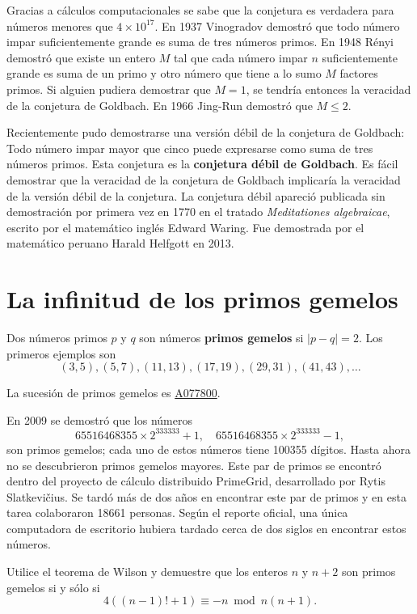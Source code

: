 Gracias a cálculos computacionales se sabe que la conjetura es verdadera para
números menores que $4\times 10^{17}$. En 1937 Vinogradov demostró que todo
número impar suficientemente grande es suma de tres números primos. En 1948
Rényi demostró que existe un entero $M$ tal que cada número impar $n$
suficientemente grande es suma de un primo y otro número que tiene a lo sumo
$M$ factores primos. Si alguien pudiera demostrar que $M=1$, se tendría
entonces la veracidad de la conjetura de Goldbach. En 1966 Jing-Run demostró
que $M\leq 2$. 

Recientemente pudo demostrarse una versión débil de la conjetura de Goldbach:
Todo número impar mayor que cinco puede expresarse como suma de tres números
primos.  Esta conjetura es la \textbf{conjetura débil de Goldbach}. Es fácil
demostrar que la veracidad de la conjetura de Goldbach implicaría la veracidad
de la versión débil de la conjetura.  La conjetura débil apareció publicada sin
demostración por primera vez en 1770 en el tratado \emph{Meditationes
algebraicae}, escrito por el matemático inglés Edward Waring. Fue demostrada
por el matemático peruano Harald Helfgott en 2013. 

\section*{La infinitud de los primos gemelos}

Dos números primos $p$ y $q$ son números \textbf{primos gemelos} si $|p-q|=2$.
Los primeros ejemplos son
\[
	(3, 5), (5, 7), (11, 13), (17, 19), (29, 31), (41, 43),\dots
\]

La sucesión de primos gemelos es 
\href{https://oeis.org/A077800}{A077800}.

En 2009 se demostró que los números 
\[
	65516468355\times 2^{333333}+1,
	\quad
	65516468355\times 2^{333333}-1,
\]
son primos gemelos; cada uno de estos números tiene 100355 dígitos.  Hasta
ahora no se descubrieron primos gemelos mayores. Este par de primos se encontró
dentro del proyecto de cálculo distribuido PrimeGrid, desarrollado por Rytis
Slatkevi\v{c}ius.  Se tardó más de dos años en encontrar este par de primos y
en esta tarea colaboraron 18661 personas. Según el reporte oficial, una única
computadora de escritorio hubiera tardado cerca de dos siglos en encontrar
estos números.

\begin{exercise}
	Utilice el teorema de Wilson y 
	demuestre que los enteros $n$ y $n+2$ son primos gemelos si y sólo si
	\[
		4( (n-1)!+1)\equiv -n\bmod{n(n+1)}.
	\]
\end{exercise}

